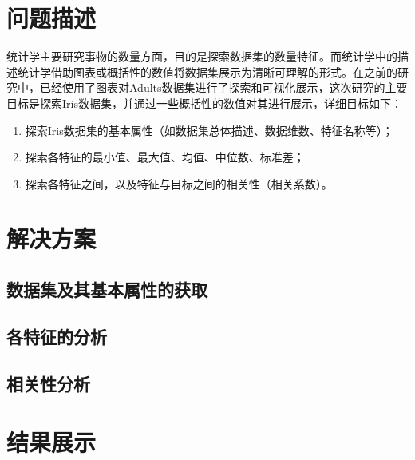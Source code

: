 \documentclass[12pt,a4paper]{article}
\theoremstyle{definition}
\begin{document}
\noindent
\noindent{}
\vspace{-1.5\baselineskip}

\section{问题描述}

统计学主要研究事物的数量方面，目的是探索数据集的数量特征。而统计学中的描述统计学借助图表或概括性的数值将数据集展示为清晰可理解的形式。在之前的研究中，已经使用了图表对Adults数据集进行了探索和可视化展示，这次研究的主要目标是探索Iris数据集，并通过一些概括性的数值对其进行展示，详细目标如下：

\begin{enumerate}
	\item 探索Iris数据集的基本属性（如数据集总体描述、数据维数、特征名称等）；
	
	\item 探索各特征的最小值、最大值、均值、中位数、标准差；
	
	\item 探索各特征之间，以及特征与目标之间的相关性（相关系数）。
\end{enumerate}

\section{解决方案}

\subsection{数据集及其基本属性的获取}

\subsection{各特征的分析}

\subsection{相关性分析}

\section{结果展示}
\end{document}
